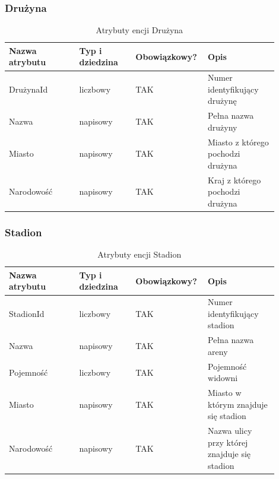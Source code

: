 \documentclass{mwrep}[15pt]
\begin{document}
\vspace{1cm}

\subsubsection{Drużyna}
\begin{table}[H]
	\begin{tabular}{|p{0.25\linewidth}|p{0.2\linewidth}|p{0.2\linewidth}|p{0.25\linewidth}|}
	\hline
	Nazwa atrybutu & Typ i dziedzina & Obowiązkowy? & Opis                                                           \\ \hline
	DrużynaId   & liczbowy                            & TAK                              & Numer identyfikujący drużynę                                                   \\ \hline
	Nazwa         & napisowy                           & TAK                              & Pełna nazwa drużyny         \\ \hline
	Miasto          & napisowy                            & TAK                              & Miasto z którego pochodzi drużyna                        \\ \hline
	Narodowość           & napisowy                            & TAK                              & Kraj z którego pochodzi drużyna                 \\ \hline
	\end{tabular}
	\caption{Atrybuty encji Drużyna}
\end{table}

\vspace{1cm}

\subsubsection{Stadion}
\begin{table}[H]
	\begin{tabular}{|p{0.25\linewidth}|p{0.2\linewidth}|p{0.2\linewidth}|p{0.25\linewidth}|}
	\hline
	Nazwa atrybutu & Typ i dziedzina & Obowiązkowy? & Opis                                                           \\ \hline
	StadionId   & liczbowy                            & TAK                              & Numer identyfikujący stadion                                                   \\ \hline
	Nazwa         & napisowy                           & TAK                              & Pełna nazwa areny         \\ \hline
	Pojemność 	   & liczbowy							& TAK								& Pojemność widowni \\  \hline
	Miasto          & napisowy                            & TAK                              & Miasto w którym znajduje się stadion                       \\ \hline
	Narodowość           & napisowy                            & TAK                              & Nazwa ulicy przy której znajduje się stadion   \\ \hline
	\end{tabular}
	\caption{Atrybuty encji Stadion}
\end{table}
\end{document}
